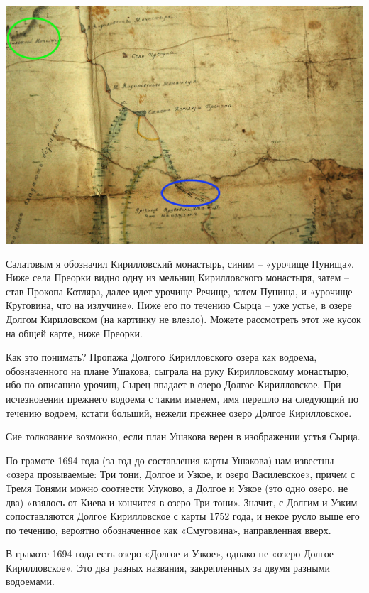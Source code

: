 \begin{center}
\includegraphics[width=\linewidth]{chast-colebanie-osnov/pochayna/1752-pun.jpg}
\end{center}

Салатовым я обозначил Кирилловский монастырь, синим – «урочище Пунища». Ниже села Преорки видно одну из мельниц Кирилловского монастыря, затем – став Прокопа Котляра, далее идет урочище Речище, затем Пунища, и «урочище Круговина, что на излучине». Ниже его по течению Сырца – уже устье, в озере Долгом Кириловском (на картинку не влезло). Можете рассмотреть этот же кусок на общей карте, ниже Преорки.

Как это понимать? Пропажа Долгого Кирилловского озера как водоема, обозначенного на плане Ушакова, сыграла на руку Кирилловскому монастырю, ибо по описанию урочищ, Сырец впадает в озеро Долгое Кирилловское. При исчезновении прежнего водоема с таким именем, имя перешло на следующий по течению водоем, кстати больший, нежели прежнее озеро Долгое Кирилловское.

Сие толкование возможно, если план Ушакова верен в изображении устья Сырца. 

По грамоте 1694 года (за год до составления карты Ушакова) нам известны «озера прозываемые: Три тони, Долгое и Узкое, и озеро Василевское», причем с Тремя Тонями можно соотнести Улуково, а Долгое и Узкое (это одно озеро, не два) «взялось от Киева и кончится в озеро Три-тони». Значит, с Долгим и Узким сопоставляются Долгое Кирилловское с карты 1752 года, и некое русло выше его по течению, вероятно обозначенное как «Смуговина», направленная вверх.

В грамоте 1694 года есть озеро «Долгое и Узкое», однако не «озеро Долгое Кирилловское». Это два разных названия, закрепленных за двумя разными водоемами.
 
